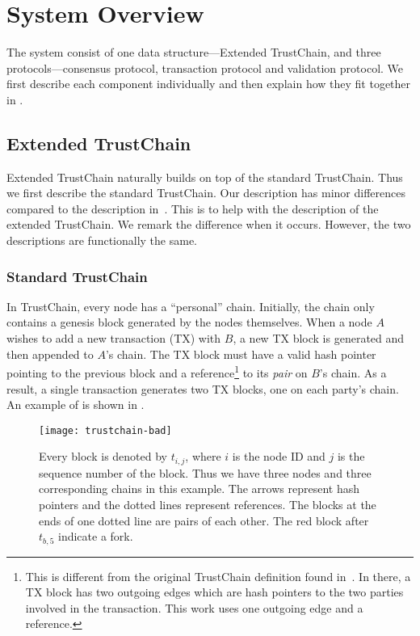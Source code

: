 \section{System Overview}
\label{sec:system-overview}
The system consist of one data structure---Extended TrustChain,
and three protocols---consensus protocol, transaction protocol and validation protocol.
We first describe each component individually and then explain how they fit together in .

\subsection{Extended TrustChain}
Extended TrustChain naturally builds on top of the standard TrustChain. 
Thus we first describe the standard TrustChain.
Our description has minor differences compared to the description in~\cite{trustchain}.
This is to help with the description of the extended TrustChain.
We remark the difference when it occurs.
However, the two descriptions are functionally the same.

\subsubsection*{Standard TrustChain}
In TrustChain, every node has a ``personal'' chain. 
Initially, the chain only contains a genesis block generated by the nodes themselves.
When a node $A$ wishes to add a new transaction (TX) with $B$, a new TX block is generated and then appended to $A$'s chain.
The TX block must have a valid hash pointer pointing to the previous block
and a reference\footnote{This is different from the original TrustChain definition found in~\cite{trustchain}.
In there, a TX block has two outgoing edges which are hash pointers to the two parties involved in the transaction.
This work uses one outgoing edge and a reference.} to its \emph{pair} on $B$'s chain.
As a result, a single transaction generates two TX blocks, one on each party's chain.
An example of is shown in .

\begin{figure}
    \texttt{[image: trustchain-bad]}
    \centering
    \caption{Every block is denoted by $t_{i,j}$, where $i$ is the node ID and $j$ is the sequence number of the block.
    Thus we have three nodes and three corresponding chains in this example.
    The arrows represent hash pointers and the dotted lines represent references.
    The blocks at the ends of one dotted line are pairs of each other.
    The red block after $t_{b, 5}$ indicate a fork.}
    \label{fig:trustchain-bad}
\end{figure}

